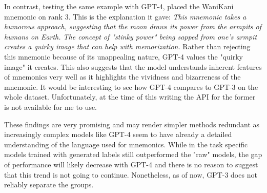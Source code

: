 In contrast, testing the same example with GPT-4, placed the WaniKani mnemonic on rank 3. This is the explanation it gave: \emph{This mnemonic takes a humorous approach, suggesting that the moon draws its power from the armpits of humans on Earth. The concept of "stinky power" being sapped from one's armpit creates a quirky image that can help with memorization.} Rather than rejecting this mnemonic because of its unappealing nature, GPT-4 values the "quirky image" it creates. This also suggests that the model understands inherent features of mnemonics very well as it highlights the vividness and bizarreness of the mnemonic. It would be interesting to see how GPT-4 compares to GPT-3 on the whole dataset. Unfortunately, at the time of this writing the API for the former is not available for me to use. 

These findings are very promising and may render simpler methods redundant as increasingly complex models like GPT-4 seem to have already a detailed understanding of the language used for mnemonics. While in \cite{wang2021want} the task specific models trained with generated labels still outperformed the "raw" models, the gap of performance will likely decrease with GPT-4 and there is no reason to suggest that this trend is not going to continue. Nonetheless, as of now, GPT-3 does not reliably separate the groups.
